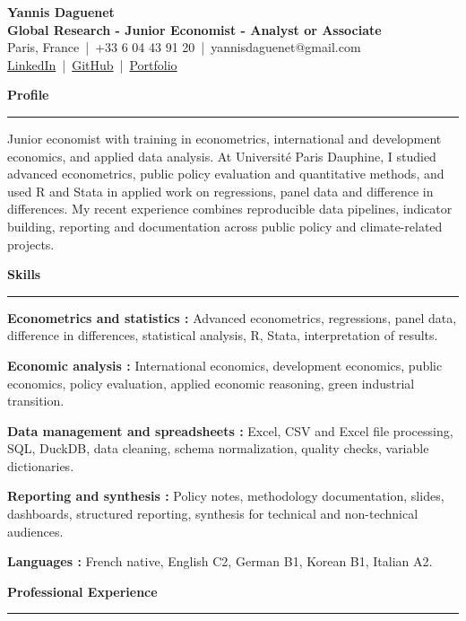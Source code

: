 \documentclass[11pt,a4paper]{article}
\newcommand{\sectiontitle}[1]{\vspace{0.26cm}\textbf{\large #1}\vspace{0.10cm}\hrule\vspace{0.13cm}}
\begin{document}
\begin{center}
{\Large \textbf{Yannis Daguenet} }\\
\textbf{Global Research - Junior Economist - Analyst or Associate}\\
Paris, France \,|\, +33 6 04 43 91 20 \,|\, yannisdaguenet@gmail.com \\
\href{https://linkedin.com/in/yannis-daguenet}{LinkedIn} \,|\, \href{https://github.com/DaguenetYannis}{GitHub} \,|\, \href{https://daguenetyannisportfolio.netlify.app/}{Portfolio}\end{center}

\sectiontitle{Profile}

Junior economist with training in econometrics, international and development economics, and applied data analysis. At Université Paris Dauphine, I studied advanced econometrics, public policy evaluation and quantitative methods, and used R and Stata in applied work on regressions, panel data and difference in differences. My recent experience combines reproducible data pipelines, indicator building, reporting and documentation across public policy and climate-related projects.

\sectiontitle{Skills}

\textbf{Econometrics and statistics :} Advanced econometrics, regressions, panel data, difference in differences, statistical analysis, R, Stata, interpretation of results.

\vspace{0.08cm}
\textbf{Economic analysis :} International economics, development economics, public economics, policy evaluation, applied economic reasoning, green industrial transition.

\vspace{0.08cm}
\textbf{Data management and spreadsheets :} Excel, CSV and Excel file processing, SQL, DuckDB, data cleaning, schema normalization, quality checks, variable dictionaries.

\vspace{0.08cm}
\textbf{Reporting and synthesis :} Policy notes, methodology documentation, slides, dashboards, structured reporting, synthesis for technical and non-technical audiences.

\vspace{0.08cm}
\textbf{Languages :} French native, English C2, German B1, Korean B1, Italian A2.


\sectiontitle{Professional Experience}
\end{document}
